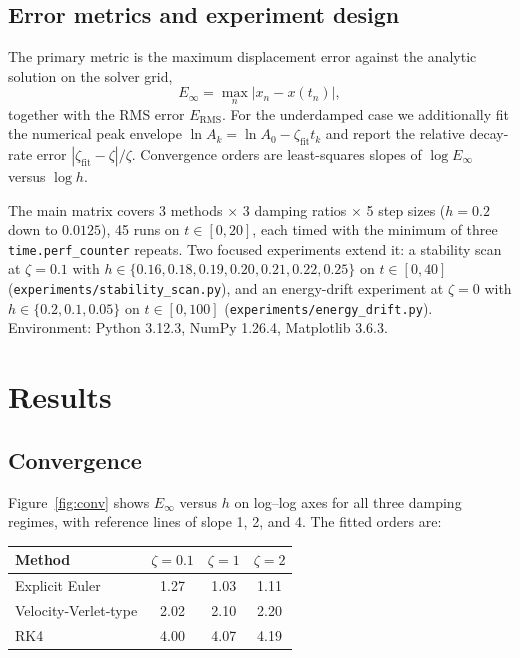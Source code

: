 \documentclass[11pt,a4paper]{article}
\begin{document}
\subsection{Error metrics and experiment design}
The primary metric is the maximum displacement error against the
analytic solution on the solver grid,
\begin{equation}
E_\infty = \max_n |x_n - x(t_n)|,
\end{equation}
together with the RMS error $E_{\mathrm{RMS}}$.
For the underdamped case we additionally fit the numerical peak
envelope $\ln A_k = \ln A_0 - \zeta_{\mathrm{fit}} t_k$ and report the
relative decay-rate error
$|\zeta_{\mathrm{fit}}-\zeta|/\zeta$.
Convergence orders are least-squares slopes of $\log E_\infty$ versus
$\log h$.

The main matrix covers 3 methods $\times$ 3 damping ratios
$\times$ 5 step sizes ($h=0.2$ down to $0.0125$), 45 runs on
$t\in[0,20]$, each timed with the minimum of three
\texttt{time.perf\_counter} repeats. Two focused experiments extend it:
a stability scan at $\zeta=0.1$ with
$h\in\{0.16,0.18,0.19,0.20,0.21,0.22,0.25\}$ on $t\in[0,40]$
(\texttt{experiments/stability\_scan.py}), and an energy-drift experiment
at $\zeta=0$ with $h\in\{0.2,0.1,0.05\}$ on $t\in[0,100]$
(\texttt{experiments/energy\_drift.py}).
Environment: Python 3.12.3, NumPy 1.26.4, Matplotlib 3.6.3.

\section{Results}
\subsection{Convergence}
\label{sec:conv}
Figure~\ref{fig:conv} shows $E_\infty$ versus $h$ on log--log axes for
all three damping regimes, with reference lines of slope 1, 2, and 4.
The fitted orders are:

\begin{center}
\begin{tabular}{lccc}
\toprule
Method & $\zeta=0.1$ & $\zeta=1$ & $\zeta=2$ \\
\midrule
Explicit Euler & 1.27 & 1.03 & 1.11 \\
Velocity-Verlet-type & 2.02 & 2.10 & 2.20 \\
RK4 & 4.00 & 4.07 & 4.19 \\
\bottomrule
\end{tabular}
\end{center}
\end{document}
